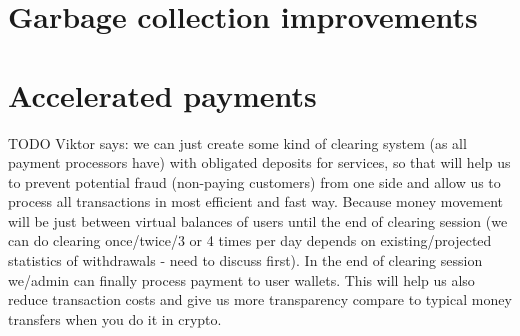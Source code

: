 \documentclass[11pt,fleqn,openany]{book}
\newcommand{\todo}[1]{{\color{red} TODO #1 }}
\begin{document}
\section{Garbage collection improvements}
\section{Accelerated payments}

\todo{Viktor says:
we can just create some kind of clearing system (as all payment processors have) with obligated deposits for services, so that will help us to prevent potential fraud (non-paying customers) from one side and allow us to process all transactions in most efficient and fast way. Because money movement will be just between virtual balances of users until the end of clearing session (we can do clearing once/twice/3 or 4 times per day depends on existing/projected statistics of withdrawals - need to discuss first). In the end of clearing session we/admin can finally process payment to user wallets. This will help us also reduce transaction costs and give us more transparency compare to typical money transfers when you do it in crypto.
}
\end{document}
